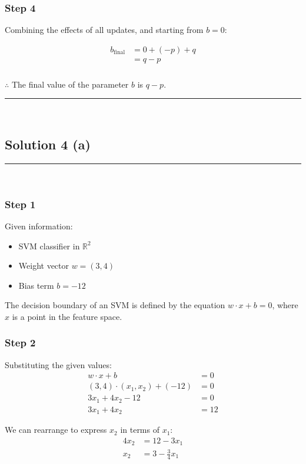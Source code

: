 \documentclass{article}
\begin{document}
\subsubsection*{Step 4}
\parbox{\textwidth}{
Combining the effects of all updates, and starting from $b = 0$:

\begin{align}
b_{\text{final}} &= 0 + (-p) + q\\
&= q - p
\end{align}
}

\subsubsection*{\normalfont}{$\therefore$ The final value of the parameter $b$ is $q - p$.}

\noindent\rule{\textwidth}{0.4pt}\\

\newpage

\subsection*{Solution 4 (a)}
\noindent\rule{\textwidth}{0.4pt}\\

\subsubsection*{Step 1}
\parbox{\textwidth}{
Given information:
\begin{itemize}
    \item SVM classifier in $\mathbb{R}^{2}$
    \item Weight vector $w = (3, 4)$
    \item Bias term $b = -12$
\end{itemize}

The decision boundary of an SVM is defined by the equation $w \cdot x + b = 0$, where $x$ is a point in the feature space.
}

\subsubsection*{Step 2}
\parbox{\textwidth}{
Substituting the given values:
\begin{align}
w \cdot x + b &= 0\\
(3, 4) \cdot (x_1, x_2) + (-12) &= 0\\
3x_1 + 4x_2 - 12 &= 0\\
3x_1 + 4x_2 &= 12
\end{align}

We can rearrange to express $x_2$ in terms of $x_1$:
\begin{align}
4x_2 &= 12 - 3x_1\\
x_2 &= 3 - \frac{3}{4}x_1
\end{align}
}
\end{document}
